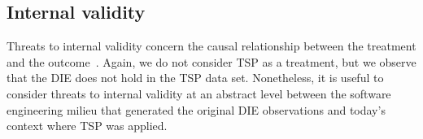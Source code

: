 \documentclass[smallcondensed]{svjour3}
\def\baselinestretch{1}
\begin{document}


\subsection{Internal validity}
Threats to internal validity concern the causal relationship between the treatment and the outcome~\cite{wohlin2012}. Again, we do not consider TSP as a treatment, but we observe that the DIE does not hold in the TSP data set. Nonetheless, it is useful to consider threats to internal validity at an abstract level between the software engineering milieu that generated the original DIE observations and today's context where TSP was applied.
\end{document}
